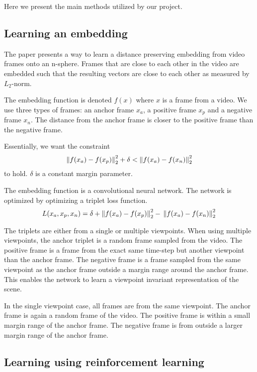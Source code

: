 
Here we present the main methods utilized by our project.

\subsection{Learning an embedding}

The paper \cite{self-supervised-learning} presents a way to learn a distance preserving embedding from video frames onto an n-sphere. Frames that are close to each other in the video are embedded such that the resulting vectors are close to each other as measured by $L_2$-norm.

The embedding function is denoted $f(x)$ where $x$ is a frame from a video. We use three types of frames: an anchor frame $x_a$, a positive frame $x_p$ and a negative frame $x_n$. The distance from the anchor frame is closer to the positive frame than the negative frame.

Essentially, we want the constraint \[
    \left\lVert f(x_a) - f(x_p)\right\rVert^2_2 + \delta < \left\lVert f(x_a) - f(x_n)\right\rVert^2_2
    \] to hold. $\delta$ is a constant margin parameter.

The embedding function is a convolutional neural network. The network is optimized by optimizing a triplet loss function. \[
    L(x_a, x_p, x_n) = \delta + \left\lVert f(x_a) - f(x_p)\right\rVert^2_2 - \\
    \left\lVert f(x_a) - f(x_n)\right\rVert^2_2
    \]

The triplets are either from a single or multiple viewpoints. When using multiple viewpoints, the anchor triplet is a random frame sampled from the video. The positive frame is a frame from the exact same time-step but another viewpoint than the anchor frame. The negative frame is a frame sampled from the same viewpoint as the anchor frame outside a margin range around the anchor frame. This enables the network to learn a viewpoint invariant representation of the scene. \citep{self-supervised-learning}

In the single viewpoint case, all frames are from the same viewpoint. The anchor frame is again a random frame of the video. The positive frame is within a small margin range of the anchor frame. The negative frame is from outside a larger margin range of the anchor frame. \citep{self-supervised-learning}

\subsection{Learning using reinforcement learning}

